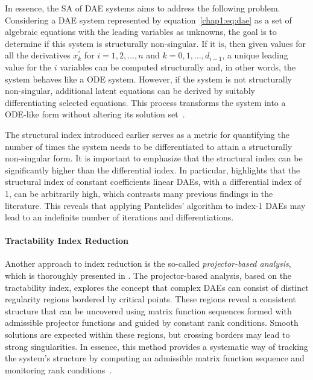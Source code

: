 In essence, the \ac{SA} of \ac{DAE} systems aims to address the following problem. Considering a \ac{DAE} system represented by equation~\eqref{chap1:eq:dae} as a set of algebraic equations with the leading variables as unknowns, the goal is to determine if this system is structurally non-singular. If it is, then given values for all the derivatives $x_k^{\prime}$ for $i = 1, 2, \dots, n$ and $k = 0, 1, \dots, d_{i-1}$, a unique leading value for the $i$ variables can be computed structurally and, in other words, the system behaves like a \ac{ODE} system. However, if the system is not structurally non-singular, additional latent equations can be derived by suitably differentiating selected equations. This process transforms the system into a \ac{ODE}-like form without altering its solution set~\cite{benveniste2021structural}.

The structural index introduced earlier serves as a metric for quantifying the number of times the system needs to be differentiated to attain a structurally non-singular form. It is important to emphasize that the structural index can be significantly higher than the differential index. In particular, \citet{reissig2000differential} highlights that the structural index of constant coefficients linear \acp{DAE}, with a differential index of 1, can be arbitrarily high, which contrasts many previous findings in the literature. This reveals that applying Pantelides' algorithm to index-1 \acp{DAE} may lead to an indefinite number of iterations and differentiations.

\paragraph{Tractability Index Reduction}

Another approach to index reduction is the so-called \emph{projector-based analysis}, which is thoroughly presented in \citet{lamour2013differential, marz2014differential}. The projector-based analysis, based on the tractability index, explores the concept that complex \acp{DAE} can consist of distinct regularity regions bordered by critical points. These regions reveal a consistent structure that can be uncovered using matrix function sequences formed with admissible projector functions and guided by constant rank conditions. Smooth solutions are expected within these regions, but crossing borders may lead to strong singularities. In essence, this method provides a systematic way of tracking the system's structure by computing an admissible matrix function sequence and monitoring rank conditions~\cite{lamour2011computational}.

